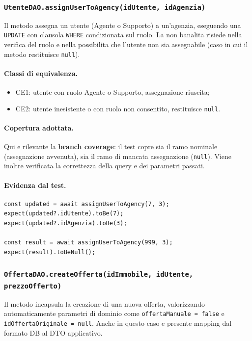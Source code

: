 \documentclass[a4paper,11pt]{article}
\begin{document}
\subsubsection{\texttt{UtenteDAO.assignUserToAgency(idUtente, idAgenzia)}}
Il metodo assegna un utente (Agente o Supporto) a un'agenzia, eseguendo una \texttt{UPDATE} con clausola \texttt{WHERE} condizionata sul ruolo. La non banalita risiede nella verifica del ruolo e nella possibilita che l'utente non sia assegnabile (caso in cui il metodo restituisce \texttt{null}).

\paragraph{Classi di equivalenza.}
\begin{itemize}
  \item CE1: utente con ruolo Agente o Supporto, assegnazione riuscita;
  \item CE2: utente inesistente o con ruolo non consentito, restituisce \texttt{null}.
\end{itemize}

\paragraph{Copertura adottata.}
Qui e rilevante la \textbf{branch coverage}: il test copre sia il ramo nominale (assegnazione avvenuta), sia il ramo di mancata assegnazione (\texttt{null}). Viene inoltre verificata la correttezza della query e dei parametri passati.

\paragraph{Evidenza dal test.}
\begin{lstlisting}[style=projectcode]
const updated = await assignUserToAgency(7, 3);
expect(updated?.idUtente).toBe(7);
expect(updated?.idAgenzia).toBe(3);

const result = await assignUserToAgency(999, 3);
expect(result).toBeNull();
\end{lstlisting}

\subsubsection{\texttt{OffertaDAO.createOfferta(idImmobile, idUtente, prezzoOfferto)}}
Il metodo incapsula la creazione di una nuova offerta, valorizzando automaticamente parametri di dominio come \texttt{offertaManuale = false} e \texttt{idOffertaOriginale = null}. Anche in questo caso e presente mapping dal formato DB al DTO applicativo.
\end{document}
